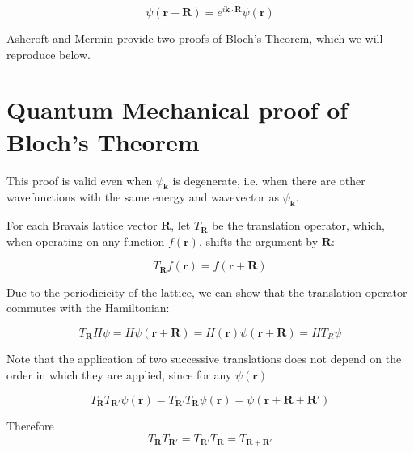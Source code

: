 	\begin{equation} \label{eq:bloch_theorem_restate}
		\psi(\mathbf{r} + \mathbf{R})
		= e^{i\mathbf{k} \cdot \mathbf{R}}
		\psi(\mathbf{r})
	\end{equation}


	Ashcroft and Mermin provide two proofs of Bloch's Theorem, which we will reproduce below.

\section{Quantum Mechanical proof of Bloch's Theorem}
	This proof is valid even when $\psi_{\mathbf{k}}$ is degenerate,  i.e. when there are other wavefunctions with the same energy and wavevector as $\psi_{\mathbf{k}}$.

	For each Bravais lattice vector $\mathbf{R}$, let $T_{\mathbf{R}}$ be the translation operator, which, when operating on any function $f(\mathbf{r})$, shifts the argument by $\mathbf{R}$:

	\begin{equation} \label{eq:translation}
		T_{\mathbf{R}} f(\mathbf{r})
		= f(\mathbf{r} + \mathbf{R})
	\end{equation}

	Due to the periodicicity of the lattice, we can show that the translation operator commutes with the Hamiltonian:

	\begin{equation} \label{eq:trans_commute1}
		T_{\mathbf{R}} H \psi
		= H \psi(\mathbf{r} + \mathbf{R})
		= H(\mathbf{r}) \psi(\mathbf{r} + \mathbf{R})
		= HT_{R} \psi
	\end{equation}

	Note that the application of two successive translations does not depend on the order in which they are applied, since for any $\psi(\mathbf{r})$

	\begin{equation} \label{eq:trans_commute2}
		T_{\mathbf{R}} T_{\mathbf{R'}} \psi(\mathbf{r})
		= T_{\mathbf{R'}} T_{\mathbf{R}} \psi(\mathbf{r})
		= \psi(\mathbf{r} + \mathbf{R} + \mathbf{R'})
	\end{equation}

	Therefore
	\begin{equation} \label{eq:trans_addition}
		T_{\mathbf{R}} T_{\mathbf{R'}}
		= T_{\mathbf{R'}} T_{\mathbf{R}}
		= T_{\mathbf{R + R'}}
	\end{equation}


